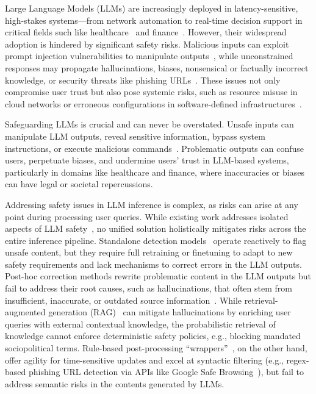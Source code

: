 
Large Language Models (LLMs) are increasingly deployed in latency-sensitive, high-stakes systems—from network automation to real-time decision support in critical fields such like healthcare~\cite{goyal2024healai,qiu2024llm,yang2024talk2care} and finance~\cite{wu2023bloomberggpt,li2023large}. However, their widespread adoption is hindered by significant safety risks. Malicious inputs can exploit prompt injection vulnerabilities to manipulate outputs~\citep{Liu2023PromptIA,Kumar2023CertifyingLS,Zhu2023PromptBenchTE,Chu2024ComprehensiveAO,Tedeschi2024ALERTAC,Zhao2024WeaktoStrongJO}, while unconstrained responses may propagate hallucinations, biases, nonsensical or factually incorrect knowledge, or security threats like phishing URLs~\citep{Zhang2023SirensSI,zhang2024efficient,Wang2023DecodingTrustAC,Fan2023OnTT,Huang2023ASO,Xu2024HallucinationII}. These issues not only compromise user trust but also pose systemic risks, such as resource misuse in cloud networks or erroneous configurations in software-defined infrastructures~\citep{llm_loops,owasp_llm01,owasp_llm03,owasp_llm04,owasp_llm05}.


Safeguarding LLMs is crucial and can never be overstated. Unsafe inputs can manipulate LLM outputs, reveal sensitive information, bypass system instructions, or execute malicious commands~\citep{Russinovich2024GreatNW,xu2024llm,chang2024play,Liu2023PromptIA,Kumar2023CertifyingLS,Zhu2023PromptBenchTE,Chu2024ComprehensiveAO,Tedeschi2024ALERTAC,Zhao2024WeaktoStrongJO}. 
Problematic outputs can confuse users, perpetuate biases, and undermine users' trust in LLM-based systems, particularly in domains like healthcare and finance, where inaccuracies or biases can have legal or societal repercussions.

Addressing safety issues in LLM inference is complex, as risks can arise at any point during processing user queries. 
While existing work addresses isolated aspects of LLM safety~\cite{kumar2024watch,elesedy2024lora,ma2023adapting,jha2024memeguard}, no unified solution holistically mitigates risks across the entire inference pipeline.
Standalone detection models~\citep{Detoxify,perspective-api,openai-data-paper} operate reactively to flag unsafe content, but they require full retraining or finetuning to adapt to new safety requirements and lack mechanisms to correct errors in the LLM outputs. 
Post-hoc correction methods rewrite problematic content in the LLM outputs but fail to address their root causes, such as hallucinations, that often stem from insufficient, inaccurate, or outdated source information~\citep{Xu2024HallucinationII,Zhang2023SirensSI,Huang2023ASO}. While retrieval-augmented generation (RAG)~\cite{rag,chen2024benchmarking,gao2023retrieval} can mitigate hallucinations by enriching user queries with external contextual knowledge, 
the probabilistic retrieval of knowledge cannot enforce deterministic safety policies, e.g., blocking mandated sociopolitical terms. 
Rule-based post-processing ``wrappers''~\citep{guardrails}, on the other hand, offer agility for time-sensitive updates and excel at syntactic filtering (e.g., regex-based phishing URL detection via APIs like Google Safe Browsing~\citep{google-safe-browsing}), but fail to address semantic risks in the contents generated by LLMs. 


